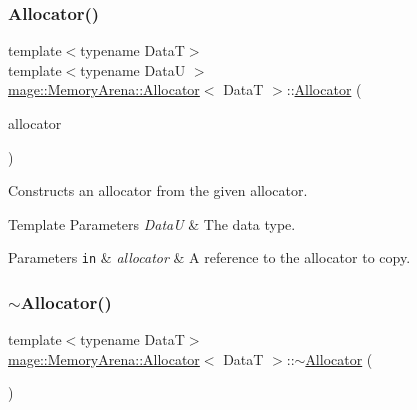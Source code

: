 \subsubsection{\texorpdfstring{Allocator()}{Allocator()}\hspace{0.1cm}{\footnotesize\ttfamily [3/4]}}
{\footnotesize\ttfamily template$<$typename DataT$>$ \\
template$<$typename DataU $>$ \\
\hyperlink{structmage_1_1_memory_arena_1_1_allocator}{mage\+::\+Memory\+Arena\+::\+Allocator}$<$ DataT $>$\+::\hyperlink{structmage_1_1_memory_arena_1_1_allocator}{Allocator} (\begin{DoxyParamCaption}\item[{const \hyperlink{structmage_1_1_memory_arena_1_1_allocator}{Allocator}$<$ DataU $>$ \&}]{allocator }\end{DoxyParamCaption})\hspace{0.3cm}{\ttfamily [noexcept]}}

Constructs an allocator from the given allocator.


\begin{DoxyTemplParams}{Template Parameters}
{\em DataU} & The data type. \\
\hline
\end{DoxyTemplParams}

\begin{DoxyParams}[1]{Parameters}
\mbox{\tt in}  & {\em allocator} & A reference to the allocator to copy. \\
\hline
\end{DoxyParams}
\hypertarget{structmage_1_1_memory_arena_1_1_allocator_a3324ead39d8cdfb8a119425879101e0a}{}\label{structmage_1_1_memory_arena_1_1_allocator_a3324ead39d8cdfb8a119425879101e0a} 
\subsubsection{\texorpdfstring{$\sim$\+Allocator()}{~Allocator()}}
{\footnotesize\ttfamily template$<$typename DataT$>$ \\
\hyperlink{structmage_1_1_memory_arena_1_1_allocator}{mage\+::\+Memory\+Arena\+::\+Allocator}$<$ DataT $>$\+::$\sim$\hyperlink{structmage_1_1_memory_arena_1_1_allocator}{Allocator} (\begin{DoxyParamCaption}{ }\end{DoxyParamCaption})\hspace{0.3cm}{\ttfamily [default]}}

